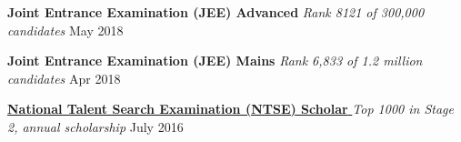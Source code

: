\textbf{Joint Entrance Examination (JEE) Advanced} \emph{Rank 8121 of 300,000 candidates} \hfill May 2018\par
\textbf{Joint Entrance Examination (JEE) Mains} \emph{Rank 6,833 of 1.2 million candidates} \hfill Apr 2018\par
\href{https://drive.google.com/file/d/15JkRFsZpjvjsXLqGZLKDH-1-XXQRB6kb/view?usp=sharing}{\textbf{National Talent Search Examination (NTSE) Scholar }} \emph{Top 1000 in Stage 2, annual scholarship} \hfill July 2016\par